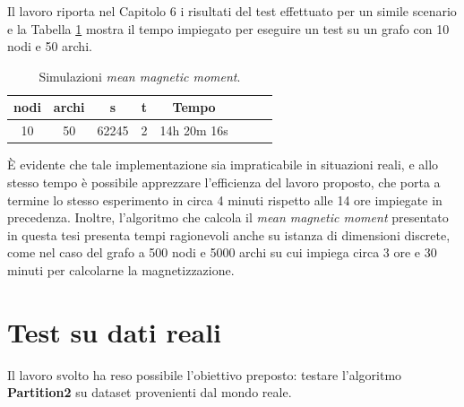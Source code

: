 Il lavoro \cite{rinaldi2016approximation} riporta nel Capitolo 6 i risultati del test effettuato per un simile scenario e la Tabella \ref{tab:mmmrin} mostra il tempo impiegato per eseguire un test su un grafo con 10 nodi e 50 archi.
\begin{table}[]
	\centering
	\begin{tabular}{|c|c|c|c|c|c|c|c|}
		\hline
		nodi & archi & s & t & Tempo\\ \hline
		10& 50& 62245& 2& 14h 20m 16s\\ \hline
	\end{tabular}
	\caption{Simulazioni \textit{mean magnetic moment}.}\label{tab:mmmrin}
\end{table}
È evidente che tale implementazione sia impraticabile in situazioni reali, e allo stesso tempo è possibile apprezzare l'efficienza del lavoro proposto, che porta a termine lo stesso esperimento in circa 4 minuti rispetto alle 14 ore impiegate in precedenza. Inoltre, l'algoritmo che calcola il \textit{mean magnetic moment} presentato in questa tesi presenta tempi ragionevoli anche su istanza di dimensioni discrete, come nel caso del grafo a 500 nodi e 5000 archi su cui impiega circa 3 ore e 30 minuti per calcolarne la magnetizzazione.
\clearpage
\section{Test su dati reali}
Il lavoro svolto ha reso possibile l'obiettivo preposto: testare l'algoritmo \textbf{Partition2} su dataset provenienti dal mondo reale.\\
